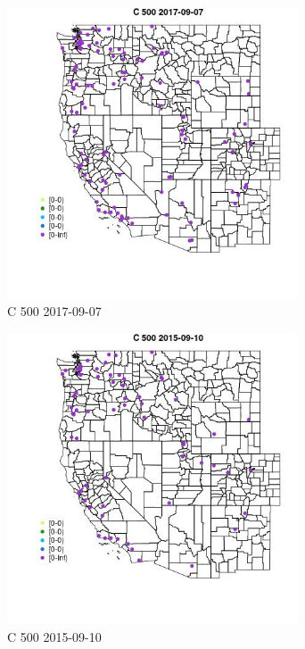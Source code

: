 \begin{figure} 
\centering  
\includegraphics[width=0.77\textwidth]{Code_Outputs/Report_ML_input_PM25_Step4_part_e_de_duplicated_aveswNAs_MapObsC_5002017-09-07.jpg} 
\caption{\label{fig:Report_ML_input_PM25_Step4_part_e_de_duplicated_aveswNAsMapObsC_5002017-09-07}C 500 2017-09-07} 
\end{figure} 
 

\clearpage 

\begin{figure} 
\centering  
\includegraphics[width=0.77\textwidth]{Code_Outputs/Report_ML_input_PM25_Step4_part_e_de_duplicated_aveswNAs_MapObsC_5002015-09-10.jpg} 
\caption{\label{fig:Report_ML_input_PM25_Step4_part_e_de_duplicated_aveswNAsMapObsC_5002015-09-10}C 500 2015-09-10} 
\end{figure} 
 


